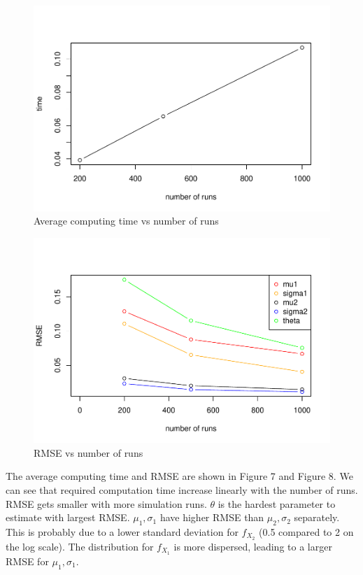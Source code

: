 \documentclass[11pt,]{article}
\begin{document}
\begin{figure}
\centering
\includegraphics{figs/unnamed-chunk-14.pdf}
\caption{Average computing time vs number of runs}
\end{figure}

\begin{figure}
\centering
\includegraphics{figs/unnamed-chunk-15.pdf}
\caption{RMSE vs number of runs}
\end{figure}

The average computing time and RMSE are shown in Figure 7 and Figure 8.
We can see that required computation time increase linearly with the
number of runs. RMSE gets smaller with more simulation runs. \(\theta\)
is the hardest parameter to estimate with largest RMSE.
\(\mu_1, \sigma_1\) have higher RMSE than \(\mu_2, \sigma_2\)
separately. This is probably due to a lower standard deviation for
\(f_{X_2}\) (0.5 compared to 2 on the log scale). The distribution for
\(f_{X_1}\) is more dispersed, leading to a larger RMSE for
\(\mu_1, \sigma_1\).
\end{document}
